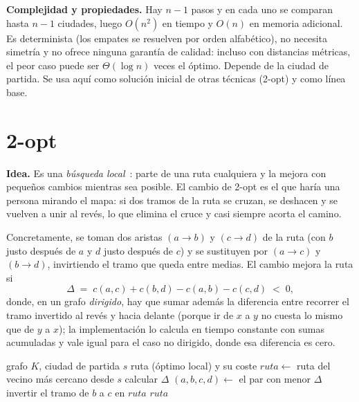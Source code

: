 \textbf{Complejidad y propiedades.} Hay $n-1$ pasos y en cada uno se comparan hasta $n-1$ ciudades, luego $O(n^2)$ en tiempo y $O(n)$ en memoria adicional. Es determinista (los empates se resuelven por orden alfabético), no necesita simetría y
no ofrece ninguna garantía de calidad: incluso con distancias métricas, el peor caso puede ser $\Theta(\log n)$ veces el óptimo. Depende de la ciudad de partida. Se usa aquí como solución inicial de otras técnicas (2-opt) y como línea base.

\section{2-opt}\label{sec:dosopt}

\textbf{Idea.} Es una \emph{búsqueda local}~\cite{croes1958}: parte de una ruta cualquiera y la mejora con pequeños cambios mientras sea posible. El cambio de 2-opt es el que haría una persona mirando el mapa: si dos tramos de la ruta se cruzan,
se deshacen y se vuelven a unir al revés, lo que elimina el cruce y casi siempre acorta el camino.

Concretamente, se toman dos aristas $(a\to b)$ y $(c\to d)$ de la ruta (con $b$ justo después de $a$ y $d$ justo después de $c$) y se sustituyen por $(a\to c)$ y $(b\to d)$, invirtiendo el tramo que queda entre medias. El cambio mejora la ruta si
\begin{equation}\label{eq:dosopt}
  \Delta\;=\;c(a,c)+c(b,d)-c(a,b)-c(c,d)\;<\;0,
\end{equation}
donde, en un grafo \emph{dirigido}, hay que sumar además la diferencia entre recorrer el tramo invertido al revés y hacia delante (porque ir de $x$ a $y$ no cuesta lo mismo que de $y$ a $x$); la implementación lo calcula en tiempo constante con sumas acumuladas
y vale igual para el caso no dirigido, donde esa diferencia es cero.

\begin{algorithm}[htbp]
  \caption{2-opt}\label{alg:2opt}
  \begin{algorithmic}[1]
    \Require grafo $K$, ciudad de partida $s$
    \Ensure ruta (óptimo local) y su coste
    \State $ruta \gets$ ruta del vecino más cercano desde $s$
    \Repeat
        \State calcular $\Delta$ 
      \EndFor
      \State $(a,b,c,d)\gets$ el par con menor $\Delta$
       \State invertir el tramo de $b$ a $c$ en $ruta$ \EndIf
    \State \Return $ruta$
  \end{algorithmic}
\end{algorithm}

